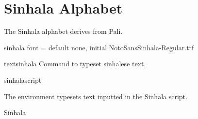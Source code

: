 
\section{Sinhala Alphabet}
\label{sec:sinhala}

The Sinhala alphabet derives from Pali.


\begin{docKey}[phd]{sinhala font}{ = }{default none, initial NotoSansSinhala-Regular.ttf}
\end{docKey}

\begin{docCommand}{textsinhala}{}
Command to typeset sinhalese text.
\end{docCommand}

\begin{docEnvironment}{sinhalascript}{}{}
\end{docEnvironment}

The  environment typesets text inputted in the Sinhala script.

\begin{scriptexample}[]{Sinhala}
\end{scriptexample}

